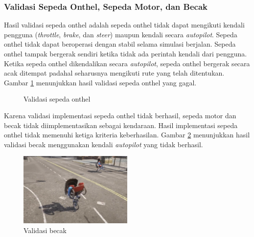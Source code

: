 \subsubsection{Validasi Sepeda Onthel, Sepeda Motor, dan Becak}

Hasil validasi sepeda onthel adalah sepeda onthel tidak dapat mengikuti kendali
pengguna (\textit{throttle}, \textit{brake}, dan \textit{steer}) maupun kendali
secara \textit{autopilot}. Sepeda onthel tidak dapat beroperasi dengan stabil
selama simulasi berjalan. Sepeda onthel tampak bergerak sendiri ketika tidak ada
perintah kendali dari pengguna. Ketika sepeda onthel dikendalikan secara
\textit{autopilot}, sepeda onthel bergerak secara acak ditempat padahal
seharusnya mengikuti rute yang telah ditentukan. Gambar
\ref{fig:onthel-validation} menunjukkan hasil validasi sepeda onthel yang gagal.

\begin{figure}[!h]
    \centering
    \hfill
    \caption{Validasi sepeda onthel}
    \label{fig:onthel-validation}
\end{figure}

Karena validasi implementasi sepeda onthel tidak berhasil, sepeda motor dan
becak tidak diimplementasikan sebagai kendaraan. Hasil implementasi sepeda
onthel tidak memenuhi ketiga kriteria keberhasilan. Gambar
\ref{fig:becak-validation} menunjukkan hasil validasi becak menggunakan kendali
\textit{autopilot} yang tidak berhasil.

\begin{figure}[!h]
    \centering
    \includegraphics[width=0.5\textwidth]{resources/chapter-4/testing-becak-generate.png}
    \caption{Validasi becak}
    \label{fig:becak-validation}
\end{figure}

